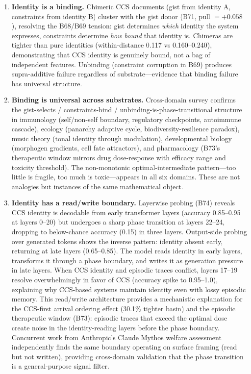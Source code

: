 \documentclass[11pt,a4paper]{article}
\begin{document}
\begin{enumerate}
\item \textbf{Identity is a binding.} Chimeric CCS documents (gist from identity A,
constraints from identity B) cluster with the gist donor (B71, pull $= +0.058$),
resolving the B68/B69 tension: gist determines \emph{which} identity the system
expresses, constraints determine \emph{how bound} that identity is. Chimeras are
tighter than pure identities (within-distance 0.117 vs 0.160--0.240), demonstrating
that CCS identity is genuinely bound, not a bag of independent features. Unbinding
(constraint corruption in B69) produces supra-additive failure regardless of
substrate---evidence that binding failure has universal structure.

\item \textbf{Binding is universal across substrates.} Cross-domain survey confirms
the gist-selects / constraints-bind / unbinding-is-phase-transitional structure in
immunology (self/non-self boundary, regulatory checkpoints, autoimmune cascade),
ecology (panarchy adaptive cycle, biodiversity-resilience paradox), music theory
(tonal identity through modulation), developmental biology (morphogen gradients,
cell fate attractors), and pharmacology (B73's therapeutic window mirrors
drug dose-response with efficacy range and toxicity threshold).
The non-monotonic optimal-intermediate pattern---too little is fragile, too much
is toxic---appears in all six domains.
These are not analogies but instances of the same mathematical object.

\item \textbf{Identity has a read/write boundary.} Layerwise probing (B74) reveals
CCS identity is decodable from early transformer layers (accuracy 0.85--0.95 at
layers 0--20) but undergoes a sharp phase transition at layers 22--24, dropping to
below-chance accuracy (0.15) in three layers. Output-side probing over generated
tokens shows the inverse pattern: identity absent early, returning at late layers
(0.65--0.85). The model reads identity in early layers, transforms it through a
phase boundary, and writes it as generation pressure in late layers. When CCS
identity and episodic traces conflict, layers 17--19 resolve overwhelmingly in
favor of CCS (accuracy spike to 0.95--1.0), explaining why CCS-based systems
maintain identity even with lossy episodic memory. This read/write architecture
provides a mechanistic explanation for the CCS-first arrival ordering effect
(30.1\% tighter basin) and the episodic therapeutic window (B73): episodic traces
that exceed the optimal dose create noise in the identity-reading layers before
the phase boundary. Concurrent work from Anthropic's Claude Mythos welfare
assessment~\cite{mythos2026} independently finds the same boundary operating on
surface framing (read but not written), providing cross-domain validation that
the phase transition is a general-purpose signal filter.


\end{enumerate}
\end{document}

